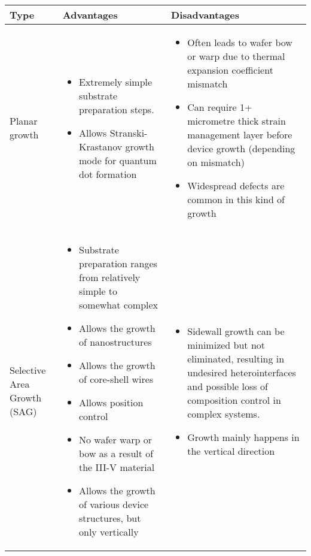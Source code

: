 \begin{sidewaystable}
    \centering
\begin{longtable}{p{}|p{}|p{}}
    Type & Advantages & Disadvantages \\ \hline \hline
    Planar growth & 
    \begin{itemize}
        \item Extremely simple substrate preparation steps.
        \item Allows Stranski-Krastanov growth mode for quantum dot formation \cite{Shi2016, Reithmaier2016}
    \end{itemize} & 
    \begin{itemize}
        \item Often leads to wafer bow or warp due to thermal expansion coefficient mismatch \cite{Miyoshi2016, Wang2017_2}
        \item Can require 1+ micrometre thick strain management layer before device growth (depending on mismatch) \cite{Wang2017_2, Cantoro2012}
        \item Widespread defects are common in this kind of growth \cite{Ravash2012}
    \end{itemize} \\ \hline
    Selective Area Growth (SAG) & 
    \begin{itemize}
        \item Substrate preparation ranges from relatively simple to somewhat complex
        \item Allows the growth of nanostructures \cite{Cantoro2012}
        \item Allows the growth of core-shell wires \cite{Tomioka2011}
        \item Allows position control \cite{Tomioka2011}
        \item No wafer warp or bow as a result of the III-V material
        \item Allows the growth of various device structures, but only vertically \cite{Bi2019, Staudinger2021}
    \end{itemize}  & 
    \begin{itemize}
        \item Sidewall growth can be minimized but not eliminated, resulting in undesired heterointerfaces and possible loss of composition control in complex systems.
        \item Growth mainly happens in the vertical direction
    \end{itemize}  \\ \hline

\end{longtable}
\end{sidewaystable}
